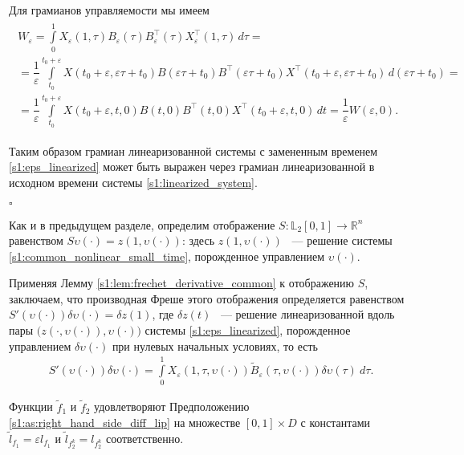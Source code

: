 \documentclass[../main.tex]{subfiles}
\begin{document}
Для грамианов управляемости мы имеем
\begin{gather*}
\begin{gathered}
 W_{\varepsilon} =
 \int\limits_0^1
 X_{ \varepsilon} (1,\tau)
 B_{\varepsilon}(\tau)
 B_{\varepsilon}^{\top}(\tau)
 X_{ \varepsilon}^{\top} (1,\tau) \, d\tau = \\
 = \dfrac{1}{\varepsilon} \int\limits_{t_0}^{t_0+\varepsilon}
 X(t_0+\varepsilon,\varepsilon \tau + t_0)
 B(\varepsilon \tau + t_0)
 B^{\top}(\varepsilon \tau + t_0)
 X^{\top}(t_0+\varepsilon,\varepsilon \tau + t_0) \,
 d\left( \varepsilon\tau + t_0\right) = \\ =
 \dfrac{1}{\varepsilon} \int\limits_{t_0}^{t_0+\varepsilon}
 X(t_0+\varepsilon,t, 0)
 B(t, 0)
 B^{\top}(t, 0)
 X^{\top}(t_0+\varepsilon,t, 0) \, dt = \dfrac{1}{\varepsilon} W(\varepsilon, 0). 
\end{gathered}
\end{gather*}

Таким образом грамиан линеаризованной системы с замененным временем \eqref{s1:eps_linearized} может быть выражен через грамиан линеаризованной в исходном времени системы \eqref{s1:linearized_system}. 

\hfill $\square$
 
Как и в предыдущем разделе, определим отображение $S: \mathbb{L}_2[0,1] \rightarrow \mathbb{R}^n $ равенством $S\upsilon(\cdot) = z(1,\upsilon(\cdot))$: здесь $ z(1,\upsilon(\cdot))$ ~--- решение системы \eqref{s1:common_nonlinear_small_time}, порожденное управлением $\upsilon(\cdot)$. 
 
Применяя Лемму \ref{s1:lem:frechet_derivative_common} к отображению $S$, заключаем, что производная Фреше этого отображения определяется равенством $ S'(\upsilon(\cdot))\delta \upsilon(\cdot) = \delta z(1)$, где $\delta z(t)$ ~--- решение линеаризованной вдоль пары $\big( z(\cdot,\upsilon(\cdot)),\upsilon(\cdot)\big) $ системы \eqref{s1:eps_linearized}, порожденное управлением $\delta \upsilon(\cdot)$ при нулевых начальных условиях, то есть
\begin{gather*}
	S'(\upsilon(\cdot))\delta \upsilon(\cdot) = \int\limits_0^1 X_{\varepsilon}(1, \tau, \upsilon(\cdot)) \widetilde{B}_{\varepsilon}(\tau, \upsilon(\cdot)) \delta\upsilon(\tau)\ d\tau. 
\end{gather*}
 
Функции $\widetilde{f}_1$ и $\widetilde{f}_2$ удовлетворяют Предположению \ref{s1:as:right_hand_side_diff_lip} на множестве $[0, 1]\times D$ с константами $\widetilde{l}_{f_1} = \varepsilon l_{f_1} $ и $\widetilde{l}_{f_2^k} = l_{f_2^k} $ соответственно. 
\end{document}
